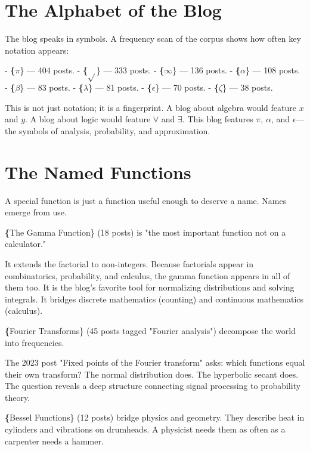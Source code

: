 
\bigskip

\section*{The Alphabet of the Blog}

The blog speaks in symbols. A frequency scan of the corpus shows how often key notation appears:

- \textbf\{$\pi$\} — 404 posts.
- \textbf\{$\sqrt{}$\} — 333 posts.
- \textbf\{$\infty$\} — 136 posts.
- \textbf\{$\alpha$\} — 108 posts.
- \textbf\{$\beta$\} — 83 posts.
- \textbf\{$\lambda$\} — 81 posts.
- \textbf\{$\epsilon$\} — 70 posts.
- \textbf\{$\zeta$\} — 38 posts.

This is not just notation; it is a fingerprint. A blog about algebra would feature $x$ and $y$. A blog about logic would feature $\forall$ and $\exists$. This blog features $\pi$, $\alpha$, and $\epsilon$—the symbols of analysis, probability, and approximation.

\bigskip

\section*{The Named Functions}

A special function is just a function useful enough to deserve a name. Names emerge from use.

\textbf\{The Gamma Function\} (18 posts) is "the most important function not on a calculator."

It extends the factorial to non-integers. Because factorials appear in combinatorics, probability, and calculus, the gamma function appears in all of them too. It is the blog's favorite tool for normalizing distributions and solving integrals. It bridges discrete mathematics (counting) and continuous mathematics (calculus).

\textbf\{Fourier Transforms\} (45 posts tagged "Fourier analysis") decompose the world into frequencies.

The 2023 post "Fixed points of the Fourier transform" asks: which functions equal their own transform? The normal distribution does. The hyperbolic secant does. The question reveals a deep structure connecting signal processing to probability theory.

\textbf\{Bessel Functions\} (12 posts) bridge physics and geometry. They describe heat in cylinders and vibrations on drumheads. A physicist needs them as often as a carpenter needs a hammer.


